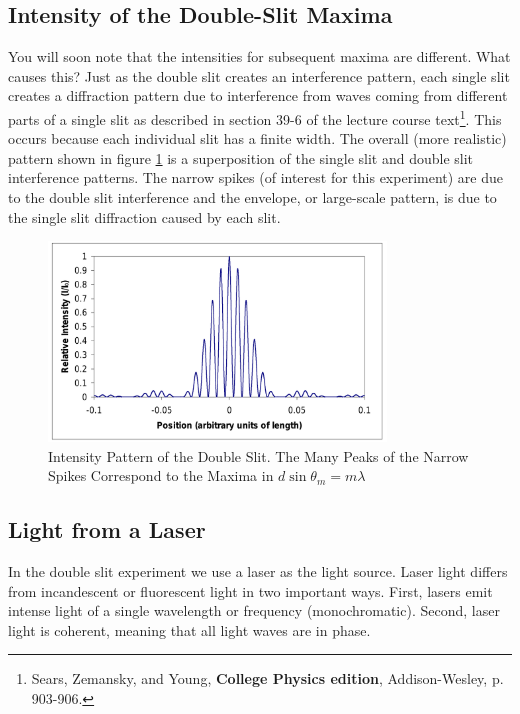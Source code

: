 \subsection{Intensity of the Double-Slit Maxima}
You will soon note that the intensities for subsequent maxima are different. What causes this? Just as the double slit creates an interference pattern, each single slit creates a diffraction pattern due to interference from waves coming from different parts of a single slit as described in section 39-6 of the lecture course text\footnote{Sears, Zemansky, and Young, \textbf{College Physics  edition}, Addison-Wesley, p. 903-906.}. This occurs because each individual slit has a finite width. The overall (more realistic) pattern shown in figure {\ref{fig:intensity}} is a superposition of the single slit and double slit interference patterns. The narrow spikes (of interest for this experiment) are due to the double slit interference and the envelope, or large-scale pattern, is due to the single slit diffraction caused by each slit.
\begin{figure}[h]
\centering
\includegraphics[width=0.8\textwidth]{./Exp8/pic/image6.png}
\caption{Intensity Pattern of the Double Slit. The Many Peaks of the Narrow Spikes Correspond to the Maxima in $d\sin\theta_{m}=m\lambda$}
\label{fig:intensity}
\end{figure} 

\subsection{Light from a Laser}
In the double slit experiment we use a laser as the light source. Laser light differs from incandescent or fluorescent light in two important ways. First, lasers emit intense light of a single wavelength or frequency (monochromatic). Second, laser light is coherent, meaning that all light waves are in phase.\myskip

